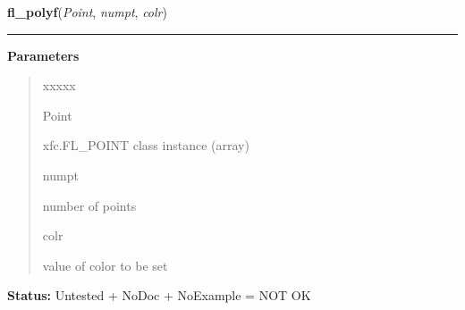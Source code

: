 \hspace{.8\funcindent}\begin{boxedminipage}{\funcwidth}

    \raggedright \textbf{fl\_polyf}(\textit{Point}, \textit{numpt}, \textit{colr})

    \vspace{-1.5ex}

    \rule{\textwidth}{0.5\fboxrule}
\setlength{\parskip}{2ex}
\setlength{\parskip}{1ex}
      \textbf{Parameters}
      \vspace{-1ex}

      \begin{quote}
        \begin{Ventry}{xxxxx}

          \item[Point]

          xfc.FL\_POINT class instance (array)

          \item[numpt]

          number of points

          \item[colr]

          value of color to be set

        \end{Ventry}

      \end{quote}

\textbf{Status:} Untested + NoDoc + NoExample = NOT OK



    \end{boxedminipage}

    \label{xformslib:library:fl_polyl}

    \vspace{0.5ex}

